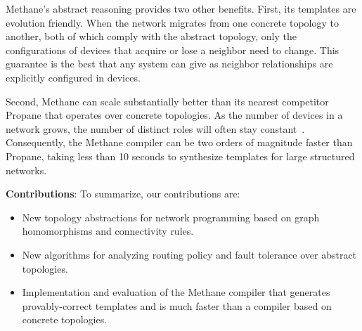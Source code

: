 \documentclass[numbers, 10pt, preprint]{sigplanconf}
\newcommand{\todo}[1]{\textcolor{red}{[TODO: #1]}}
\newcommand{\sysname}{{\small \sf Methane}\xspace}
\newcommand{\propane}{{\small \sf Propane}\xspace}
\begin{document}
\sysname's abstract reasoning provides two other benefits. First, its templates are evolution friendly. When the network migrates from
one concrete topology to another, both of which comply with the abstract
topology, only the configurations of devices that acquire or lose a neighbor need to change. This guarantee is the best that any system can give as neighbor relationships are explicitly configured in devices.

Second, \sysname can scale substantially better than its nearest competitor \propane that operates over concrete topologies. As the number of devices in a
network grows, the number of distinct roles will often stay constant~\cite{surgeries-popl16}.
Consequently, the \sysname compiler can be two orders of magnitude
faster than \propane, taking less than 10 seconds to synthesize templates for large structured networks.



\vspace{1em}
\noindent
\textbf{Contributions}: To summarize, our contributions are:
%
\begin{itemize}[noitemsep,nolistsep,label={\large\textbullet}]
\item New topology abstractions for network programming
based on graph homomorphisms and connectivity rules.
\item New algorithms for analyzing routing policy and fault tolerance over
abstract topologies.
\item Implementation and evaluation of the \sysname compiler that generates
provably-correct templates and is much faster
than a compiler based on concrete topologies.
\end{itemize}


\end{document}
